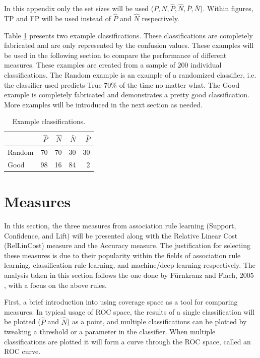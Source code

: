In this appendix only the set sizes will be used ($P, N, \hat P, \hat N, \bar P, \bar N$). Within figures, TP and FP will be used instead of $\hat P$ and $\hat N$ respectively.

Table \ref{tbl:perf:examples} presents two example classifications. These classifications are completely fabricated and are only represented by the confusion values. These examples will be used in the following section to compare the performance of different measures. These examples are created from a sample of 200 individual classifications. The Random example is an example of a randomized classifier, i.e. the classifier used predicts True 70\% of the time no matter what. The Good example is completely fabricated and demonstrates a pretty good classification. More examples will be introduced in the next section as needed.

\begin{table}[h]
	\centering

	\begin{tabular}{lrrrr}
	\toprule
	{} &    $\hat P$ & $\hat N$ & $\bar N$ & $\bar P$ \\
	\midrule
	Random & 70 & 70 & 30 & 30 \\
	Good   & 98 & 16 & 84 & 2  \\
	\bottomrule
	\end{tabular}

	\caption{Example classifications.}
	\label{tbl:perf:examples}
\end{table}


\section{Measures} \label{chap:perf:measures}

In this section, the three measures from association rule learning (Support, Confidence, and Lift) will be presented along with the Relative Linear Cost (RelLinCost) measure and the Accuracy measure.
The justification for selecting these measures is due to their popularity within the fields of association rule learning, classification rule learning, and machine/deep learning respectively.
The analysis taken in this section follows the one done by F{\"u}rnkranz and Flach, 2005 \cite{furnkranz2005roc} \cite{furnkranz2012foundations}, with a focus on the above rules.


First, a brief introduction into using coverage space as a tool for comparing measures. In typical usage of ROC space, the results of a single classification will be plotted ($\hat P$ and $\hat N$) as a point, and multiple classifications can be plotted by tweaking a threshold or a parameter in the classifier. When multiple classifications are plotted it will form a curve through the ROC space, called an ROC curve.

